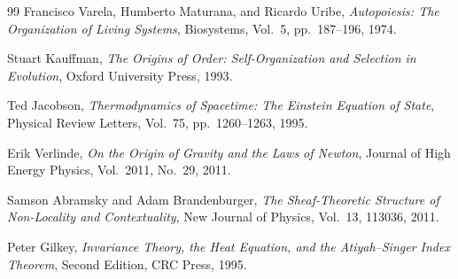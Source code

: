 \documentclass[12pt,a4paper]{article}
\begin{document}
\begin{thebibliography}{99}
Francisco Varela, Humberto Maturana, and Ricardo Uribe,
\textit{Autopoiesis: The Organization of Living Systems},
Biosystems, Vol.~5, pp.~187--196, 1974.

Stuart Kauffman,
\textit{The Origins of Order: Self-Organization and Selection in Evolution},
Oxford University Press, 1993.

Ted Jacobson,
\textit{Thermodynamics of Spacetime: The Einstein Equation of State},
Physical Review Letters, Vol.~75, pp.~1260--1263, 1995.

Erik Verlinde,
\textit{On the Origin of Gravity and the Laws of Newton},
Journal of High Energy Physics, Vol.~2011, No.~29, 2011.


Samson Abramsky and Adam Brandenburger,
\textit{The Sheaf-Theoretic Structure of Non-Locality and Contextuality},
New Journal of Physics, Vol.~13, 113036, 2011.

Peter Gilkey,
\textit{Invariance Theory, the Heat Equation, and the Atiyah--Singer Index Theorem},
Second Edition, CRC Press, 1995.

\end{thebibliography}
\end{document}

